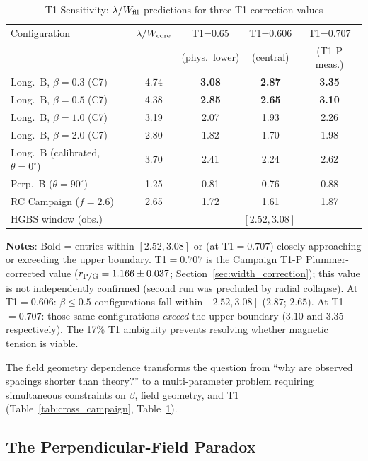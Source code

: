 \documentclass[twoside,twocolumn]{mnras}
\begin{document}
\begin{table}
\caption{T1 Sensitivity: $\lambda/W_{\rm fil}$ predictions for three T1 correction values}
\label{tab:t1_budget}
\small
\begin{tabular}{lcccc}
\toprule
Configuration & $\lambda/W_{\rm core}$ & T1=0.65 & T1=0.606 & T1=0.707 \\
              &                       & (phys.\ lower) & (central) & (T1-P meas.) \\
\midrule
Long.\ B, $\beta=0.3$ (C7) & 4.74 & \textbf{3.08} & \textbf{2.87} & \textbf{3.35} \\
Long.\ B, $\beta=0.5$ (C7) & 4.38 & \textbf{2.85} & \textbf{2.65} & \textbf{3.10} \\
Long.\ B, $\beta=1.0$ (C7) & 3.19 & 2.07 & 1.93 & 2.26 \\
Long.\ B, $\beta=2.0$ (C7) & 2.80 & 1.82 & 1.70 & 1.98 \\
Long.\ B (calibrated, $\theta=0^\circ$) & 3.70 & 2.41 & 2.24 & 2.62 \\
Perp.\ B ($\theta=90^\circ$) & 1.25 & 0.81 & 0.76 & 0.88 \\
RC Campaign ($f=2.6$) & 2.65 & 1.72 & 1.61 & 1.87 \\
\midrule
\multicolumn{2}{l}{HGBS window (obs.)} & \multicolumn{3}{c}{$[2.52, 3.08]$} \\
\bottomrule
\end{tabular}
\vspace{2pt}
\footnotesize
\textbf{Notes}: Bold = entries within $[2.52, 3.08]$ or (at T1$=0.707$) closely approaching or exceeding the upper boundary. T1$=0.707$ is the Campaign T1-P Plummer-corrected value ($r_{\rm P/G} = 1.166 \pm 0.037$; Section~\ref{sec:width_correction}); this value is not independently confirmed (second run was precluded by radial collapse). At T1$=0.606$: $\beta \leq 0.5$ configurations fall within $[2.52, 3.08]$ ($2.87$; $2.65$). At T1$=0.707$: those same configurations \textit{exceed} the upper boundary ($3.10$ and $3.35$ respectively). The 17\% T1 ambiguity prevents resolving whether magnetic tension is viable.
\end{table}

The field geometry dependence transforms the question from ``why are observed spacings
shorter than theory?'' to a multi-parameter problem requiring simultaneous constraints
on $\beta$, field geometry, and T1 (Table~\ref{tab:cross_campaign}, Table~\ref{tab:t1_budget}).

\subsection{The Perpendicular-Field Paradox}
\label{sec:perp_paradox}
\end{document}
